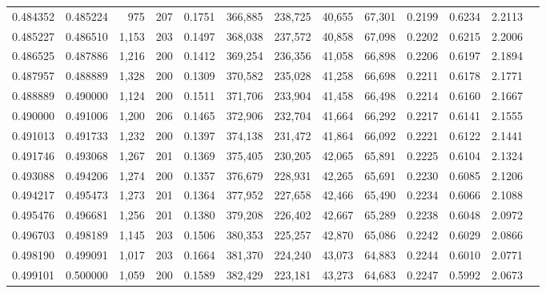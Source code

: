 \begin{tabular}{rrrrrrrrrrrrr}
0.484352 & 0.485224 &    975 &   207 &                                     0.1751 & 366,885 & 238,725 &  40,655 &  67,301 & 0.2199 & 0.6234 & 2.2113 \\
0.485227 & 0.486510 &  1,153 &   203 &                                     0.1497 & 368,038 & 237,572 &  40,858 &  67,098 & 0.2202 & 0.6215 & 2.2006 \\
0.486525 & 0.487886 &  1,216 &   200 &                                     0.1412 & 369,254 & 236,356 &  41,058 &  66,898 & 0.2206 & 0.6197 & 2.1894 \\
0.487957 & 0.488889 &  1,328 &   200 &                                     0.1309 & 370,582 & 235,028 &  41,258 &  66,698 & 0.2211 & 0.6178 & 2.1771 \\
0.488889 & 0.490000 &  1,124 &   200 &                                     0.1511 & 371,706 & 233,904 &  41,458 &  66,498 & 0.2214 & 0.6160 & 2.1667 \\
0.490000 & 0.491006 &  1,200 &   206 &                                     0.1465 & 372,906 & 232,704 &  41,664 &  66,292 & 0.2217 & 0.6141 & 2.1555 \\
0.491013 & 0.491733 &  1,232 &   200 &                                     0.1397 & 374,138 & 231,472 &  41,864 &  66,092 & 0.2221 & 0.6122 & 2.1441 \\
0.491746 & 0.493068 &  1,267 &   201 &                                     0.1369 & 375,405 & 230,205 &  42,065 &  65,891 & 0.2225 & 0.6104 & 2.1324 \\
0.493088 & 0.494206 &  1,274 &   200 &                                     0.1357 & 376,679 & 228,931 &  42,265 &  65,691 & 0.2230 & 0.6085 & 2.1206 \\
0.494217 & 0.495473 &  1,273 &   201 &                                     0.1364 & 377,952 & 227,658 &  42,466 &  65,490 & 0.2234 & 0.6066 & 2.1088 \\
0.495476 & 0.496681 &  1,256 &   201 &                                     0.1380 & 379,208 & 226,402 &  42,667 &  65,289 & 0.2238 & 0.6048 & 2.0972 \\
0.496703 & 0.498189 &  1,145 &   203 &                                     0.1506 & 380,353 & 225,257 &  42,870 &  65,086 & 0.2242 & 0.6029 & 2.0866 \\
0.498190 & 0.499091 &  1,017 &   203 &                                     0.1664 & 381,370 & 224,240 &  43,073 &  64,883 & 0.2244 & 0.6010 & 2.0771 \\
0.499101 & 0.500000 &  1,059 &   200 &                                     0.1589 & 382,429 & 223,181 &  43,273 &  64,683 & 0.2247 & 0.5992 & 2.0673 \\

\end{tabular}
